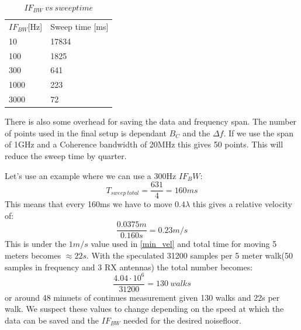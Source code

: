 \begin{table}[H]
\centering
\caption{$IF_{BW} \ vs \ sweep time$}
\label{my-label}
\begin{tabular}{l|l}
\hline
$IF_{BW}${[}Hz{]} & Sweep time {[}ms{]} \\
10              & 17834               \\
100             & 1825                \\
300             & 641                 \\
1000            & 223                 \\
3000            & 72                 
\end{tabular}
\end{table}

There is also some overhead for saving the data and frequency span. The number of points used in the final setup is dependant $B_C$ and the $\Delta f$. If we use the span of 1GHz and a Coherence bandwidth of 20MHz this gives 50 points. This will reduce the sweep time by quarter.

Let's  use an example where we can use a 300Hz $IF_BW$:
\begin{equation}
T_{sweep \ total} = \frac{631}{4} = 160ms
\end{equation}
This means that every 160ms we have to move $0.4 \lambda$ this gives a relative velocity of:
\begin{equation}
\frac{0.0375m}{0.160s} = 0.23 m/s
\end{equation}
This is under the $1m/s$ value used in \autoref{min_vel}
and total time for moving 5 meters becomes $\approx 22s$.
With the speculated 31200 samples per 5 meter walk(50 samples in frequency and 3 RX antennas) the total number becomes:
\begin{equation}
\frac{4.04 \cdot 10^6}{31200} = 130 \ walks
\end{equation}
or around 48 minuets of continues measurement given 130 walks and 22s per walk. We suspect these values to change depending on the speed at which the data can be saved and the $IF_{BW}$ needed for the desired noisefloor.
